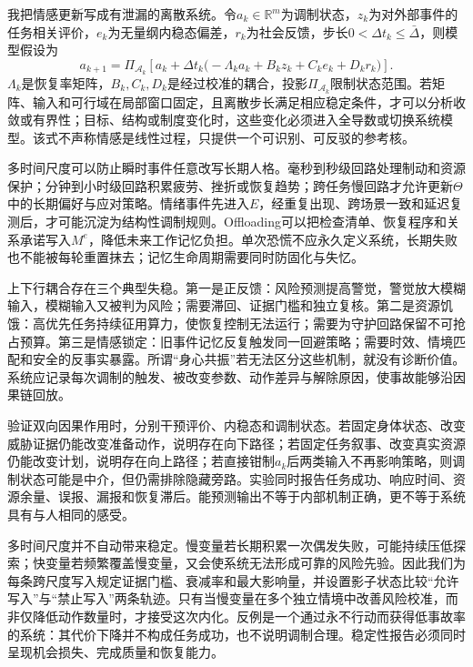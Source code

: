 我把情感更新写成有泄漏的离散系统。令$a_k\in\mathbb R^m$为调制状态，$z_k$为对外部事件的任务相关评价，$e_k$为无量纲内稳态偏差，$r_k$为社会反馈，步长$0<\Delta t_k\leq\bar\Delta$，则模型假设为
\begin{equation}
a_{k+1}=\Pi_{\mathcal A_k}\!\left[a_k+\Delta t_k\bigl(-\Lambda_k a_k+B_kz_k+C_ke_k+D_kr_k\bigr)\right].
\end{equation}
$\Lambda_k$是恢复率矩阵，$B_k,C_k,D_k$是经过校准的耦合，投影$\Pi_{\mathcal A_k}$限制状态范围。若矩阵、输入和可行域在局部窗口固定，且离散步长满足相应稳定条件，才可以分析收敛或有界性；目标、结构或制度变化时，这些变化必须进入全导数或切换系统模型。该式不声称情感是线性过程，只提供一个可识别、可反驳的参考核。

多时间尺度可以防止瞬时事件任意改写长期人格。毫秒到秒级回路处理制动和资源保护；分钟到小时级回路积累疲劳、挫折或恢复趋势；跨任务慢回路才允许更新$\Theta$中的长期偏好与应对策略。情绪事件先进入$E$，经重复出现、跨场景一致和延迟复测后，才可能沉淀为结构性调制规则。Offloading可以把检查清单、恢复程序和关系承诺写入$M^e$，降低未来工作记忆负担。单次恐慌不应永久定义系统，长期失败也不能被每轮重置抹去；记忆生命周期需要同时防固化与失忆。

上下行耦合存在三个典型失稳。第一是正反馈：风险预测提高警觉，警觉放大模糊输入，模糊输入又被判为风险；需要滞回、证据门槛和独立复核。第二是资源饥饿：高优先任务持续征用算力，使恢复控制无法运行；需要为守护回路保留不可抢占预算。第三是情感锁定：旧事件记忆反复触发同一回避策略；需要时效、情境匹配和安全的反事实暴露。所谓“身心共振”若无法区分这些机制，就没有诊断价值。系统应记录每次调制的触发、被改变参数、动作差异与解除原因，使事故能够沿因果链回放。

验证双向因果作用时，分别干预评价、内稳态和调制状态。若固定身体状态、改变威胁证据仍能改变准备动作，说明存在向下路径；若固定任务叙事、改变真实资源仍能改变计划，说明存在向上路径；若直接钳制$a_k$后两类输入不再影响策略，则调制状态可能是中介，但仍需排除隐藏旁路。实验同时报告任务成功、响应时间、资源余量、误报、漏报和恢复滞后。能预测输出不等于内部机制正确，更不等于系统具有与人相同的感受。

多时间尺度并不自动带来稳定。慢变量若长期积累一次偶发失败，可能持续压低探索；快变量若频繁覆盖慢变量，又会使系统无法形成可靠的风险先验。因此我们为每条跨尺度写入规定证据门槛、衰减率和最大影响量，并设置影子状态比较“允许写入”与“禁止写入”两条轨迹。只有当慢变量在多个独立情境中改善风险校准，而非仅降低动作数量时，才接受这次内化。反例是一个通过永不行动而获得低事故率的系统：其代价下降并不构成任务成功，也不说明调制合理。稳定性报告必须同时呈现机会损失、完成质量和恢复能力。


